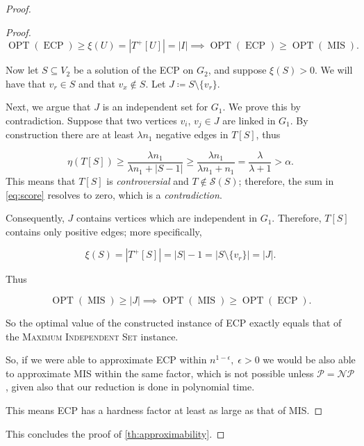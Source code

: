 \begin{proof}
\begin{proof}
		\begin{equation}
			\operatorname{OPT}(\operatorname{ECP}) \geq \xi(U) = |T^{+}[U]| =
			|I| \implies \operatorname{OPT}(\operatorname{ECP}) \geq
			\operatorname{OPT}(\operatorname{MIS}).
		\end{equation}

		Now let $S \subseteq V_2$ be a solution of the \acrshort{ECP} on $G_2$,
		and suppose $\xi(S) > 0$. We will have that $v_{r} \in S$ and that
		$v_{x} \not\in S $. Let $J \coloneqq S \setminus \{v_r\}$.

		Next, we argue that $J$ is an independent set for $G_1$. We prove this by
		contradiction. Suppose that two vertices $v_{i} $, $v_{j} \in J$ are
		linked in $G_1$. By construction there are at least $\lambda n_1$
		negative edges in $T[S]$, thus

		\begin{equation}
			\eta(T[S]) \geq \frac{\lambda n_1}{\lambda n_1 + |S-1|} \geq \frac{\lambda n_1}{\lambda n_1 + n_1} = \frac{\lambda
			}{\lambda + 1} > \alpha.
		\end{equation}
		This means that $T[S]$ is \emph{controversial} and $T \not\in
			\mathcal{S}(S) $; therefore, the sum in \eqref{eq:score} resolves to
		zero, which is a \emph{contradiction}.

		Consequently, $J$ contains vertices which are independent in $G_1$.
		Therefore, $T[S]$ contains only positive edges; more specifically,

		\begin{equation}
			\xi(S) = |T^{+}[S]| = |S| - 1 = |S \setminus \{v_r\}| = |J|.
		\end{equation}

		Thus

		\begin{equation}
			\operatorname{OPT}(\operatorname{MIS}) \geq |J| \implies
			\operatorname{OPT}(\operatorname{MIS}) \geq
			\operatorname{OPT}(\operatorname{ECP}).
		\end{equation}

		So the optimal value of the constructed instance of \acrshort{ECP}
		exactly equals that of the \textsc{Maximum Independent Set} instance.

		So, if we were able to approximate \acrshort{ECP} within
		$n^{1-\epsilon}, \; \epsilon > 0$ we would be also able to approximate MIS within the
		same factor, which is not possible unless $\mathcal{P} = \mathcal{NP}
		$, given also that our reduction is done in polynomial time.

		This means \acrshort{ECP} has a hardness factor at least as large as that of MIS.
	\end{proof}

	This concludes the proof of \autoref{th:approximability}.
\end{proof}

